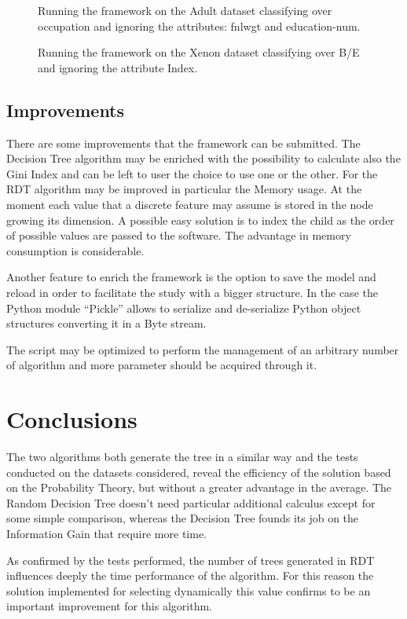 \documentclass{acm_proc_article-sp-sigmod07}
\begin{document}
\begin{figure}
\label{fig:adult-occupation}
\centering
{}
\caption{Running the framework on the Adult dataset classifying over
occupation and ignoring the attributes: fnlwgt and education-num.}
\end{figure}

\begin{figure*}
\label{fig:training_st_standard}
\centering
{}
\caption{Running the framework on the Xenon dataset classifying over B/E
and ignoring the attribute Index.}
\end{figure*}

\subsection{Improvements}
There are some improvements that the framework can be submitted.
The Decision Tree algorithm may be enriched with the possibility to
calculate also the Gini Index and can be left to user the choice to use 
one or the other. 
For the RDT algorithm may be improved in particular the Memory usage. At
the moment each value that a discrete feature may assume is stored in the
node growing its dimension. A possible easy solution is to index the child
as the order of possible values are passed to the software. The advantage
in memory consumption is considerable.

Another feature to enrich the framework is the option to save the model
and reload in order to facilitate the study with a bigger structure. In
the case the Python module ``Pickle'' allows to serialize and de-serialize
Python object structures converting it in a Byte stream.

The script may be optimized to perform the management of an arbitrary
number of algorithm and more parameter should be acquired through it.

\section{Conclusions}
The two algorithms both generate the tree in a similar way and the tests
conducted on the datasets considered, reveal the efficiency of the solution
based on the Probability Theory, but without a greater advantage in the
average. The Random Decision Tree doesn't need particular additional
calculus except for some simple comparison, whereas the Decision Tree
founds its job on the Information Gain that require more time.

As confirmed by the tests performed, the number of trees generated in RDT
influences deeply the time performance of the algorithm. For this reason
the solution implemented for selecting dynamically this value confirms to
be an important improvement for this algorithm.


\end{document}
